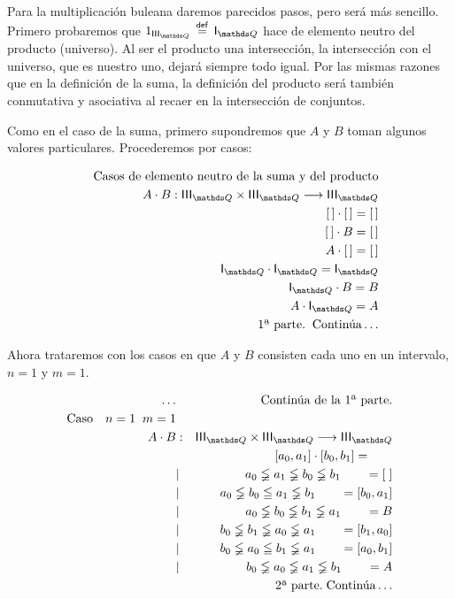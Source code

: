 \documentclass[final,12pt,a4paper,twoside,fleqn]{extbook}
\newcommand{\fromto}{\ensuremath{\longrightarrow}}
\newcommand{\mathdef}{\ensuremath{\stackrel{\mathsf{def}}{{}={}}}}
\theoremstyle{definition}
\theoremstyle{remark}
\begin{document}
	Para la multiplicación buleana daremos parecidos pasos, pero será más
sencillo. Primero probaremos que \(1_{\IIIQ} \mathdef \IQ\) hace de elemento
neutro del producto (universo). Al ser el producto una intersección, la
intersección con el universo, que es nuestro uno, dejará siempre todo igual.
Por las mismas razones que en la definición de la suma, la definición del
producto será también conmutativa y asociativa al recaer en la intersección
de conjuntos.



	Como en el caso de la suma, primero supondremos que \(A\) y \(B\) toman
algunos valores particulares. Procederemos por casos:



\begin{eqnarray}
\nonumber
&&\text{Casos de elemento neutro de la suma y del producto}\\
&&A \cdot B : \IIIQ \times \IIIQ \fromto \IIIQ\\
&&      \left[\,\right] \cdot \left[\,\right] = \left[\,\right]\\
&&      \left[\,\right] \cdot B = \left[\,\right]\\
&&      A \cdot \left[\,\right] = \left[\,\right]\\
&&      \IQ \cdot \IQ = \IQ\\
&&      \IQ \cdot B   = B\\
&&      A   \cdot \IQ = A\\ \nonumber
&&      \text{1ª parte.}\;\;\text{Continúa}\ldots
\end{eqnarray}



	Ahora trataremos con los casos en que \(A\) y \(B\) consisten cada uno en
un intervalo, \(n=1\) y \(m=1\).



\begin{eqnarray}
\nonumber
\ldots&&\text{Continúa de la 1ª parte.}\\
\text{Caso}\quad n = 1 \;\; m = 1 &&\\
A \cdot B &:& \IIIQ \times \IIIQ \fromto \IIIQ\\
      &&\left[a_0,a_1\right] \cdot \left[b_0,b_1\right] = \qquad\\
      &|& a_0 \lneqq a_1 \lneqq b_0 \lneqq b_1\qquad = \left[\;\right]\\ 
      &|& a_0 \lneqq b_0 \leqq a_1 \lneqq b_1\qquad = \left[b_0,a_1\right]\\ 
      &|& a_0 \lneqq b_0 \lneqq b_1 \lneqq a_1\qquad = B\\ 
      &|& b_0 \lneqq b_1 \lneqq a_0 \lneqq a_1\qquad = \left[b_1,a_0\right]\\ 
      &|& b_0 \lneqq a_0 \leqq b_1 \lneqq a_1\qquad = \left[a_0,b_1\right]\\ 
      &|& b_0 \lneqq a_0 \lneqq a_1 \lneqq b_1\qquad = A\\ \nonumber
      &&\text{2ª parte.}\;\text{Continúa}\ldots
\end{eqnarray}
\end{document}
